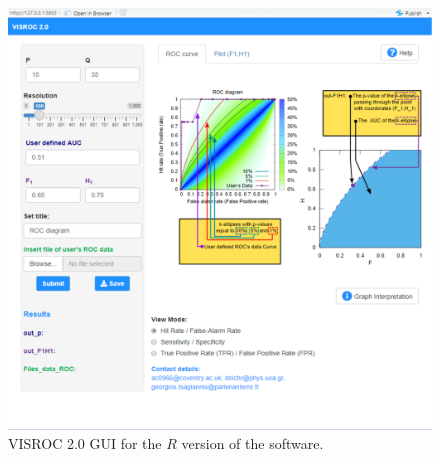\documentclass[preprint,12pt]{elsarticle}
\begin{document}






\begin{figure}
\includegraphics[scale=0.6]{Figure1.eps}
\caption{VISROC 2.0 GUI for the $R$ version of the software.}\label{fig:1}
\end{figure}
\end{document}
